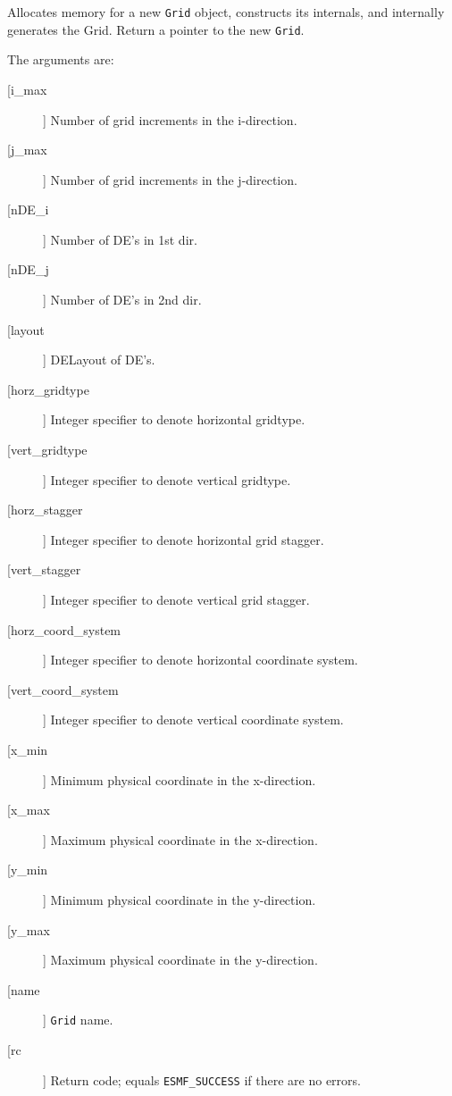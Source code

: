        Allocates memory for a new {\tt Grid} object, constructs its
       internals, and internally generates the Grid.  Return a pointer to
       the new {\tt Grid}.
  
       The arguments are:
       \begin{description}
       \item[[i\_max]]
            Number of grid increments in the i-direction.
       \item[[j\_max]]
            Number of grid increments in the j-direction.
       \item[[nDE\_i]]
            Number of DE's in 1st dir.
       \item[[nDE\_j]]
            Number of DE's in 2nd dir.
       \item[[layout]]
            DELayout of DE's.
       \item[[horz\_gridtype]]
            Integer specifier to denote horizontal gridtype.
       \item[[vert\_gridtype]]
            Integer specifier to denote vertical gridtype.
       \item[[horz\_stagger]]
            Integer specifier to denote horizontal grid stagger.
       \item[[vert\_stagger]]
            Integer specifier to denote vertical grid stagger.
       \item[[horz\_coord\_system]]
            Integer specifier to denote horizontal coordinate system.
       \item[[vert\_coord\_system]]
            Integer specifier to denote vertical coordinate system.
       \item[[x\_min]]
            Minimum physical coordinate in the x-direction.
       \item[[x\_max]]
            Maximum physical coordinate in the x-direction.
       \item[[y\_min]]
            Minimum physical coordinate in the y-direction.
       \item[[y\_max]]
            Maximum physical coordinate in the y-direction.
       \item[[name]]
            {\tt Grid} name.
       \item[[rc]]
            Return code; equals {\tt ESMF\_SUCCESS} if there are no errors.
     \end{description}
  
\begin{verbatim} \end{verbatim}
 
